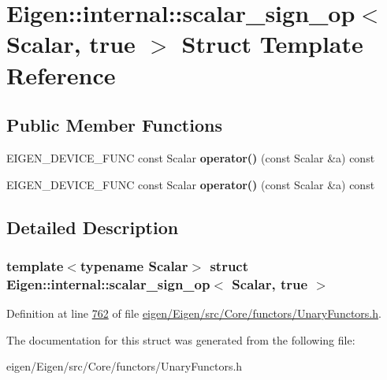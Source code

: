 \hypertarget{struct_eigen_1_1internal_1_1scalar__sign__op_3_01_scalar_00_01true_01_4}{}\section{Eigen\+:\+:internal\+:\+:scalar\+\_\+sign\+\_\+op$<$ Scalar, true $>$ Struct Template Reference}
\label{struct_eigen_1_1internal_1_1scalar__sign__op_3_01_scalar_00_01true_01_4}
\subsection*{Public Member Functions}
\begin{DoxyCompactItemize}
\item 
\mbox{\label{struct_eigen_1_1internal_1_1scalar__sign__op_3_01_scalar_00_01true_01_4_ab7a307311d19f2b54ce9805727b812a4}} 
E\+I\+G\+E\+N\+\_\+\+D\+E\+V\+I\+C\+E\+\_\+\+F\+U\+NC const Scalar {\bfseries operator()} (const Scalar \&a) const
\item 
\mbox{\label{struct_eigen_1_1internal_1_1scalar__sign__op_3_01_scalar_00_01true_01_4_ab7a307311d19f2b54ce9805727b812a4}} 
E\+I\+G\+E\+N\+\_\+\+D\+E\+V\+I\+C\+E\+\_\+\+F\+U\+NC const Scalar {\bfseries operator()} (const Scalar \&a) const
\end{DoxyCompactItemize}


\subsection{Detailed Description}
\subsubsection*{template$<$typename Scalar$>$\newline
struct Eigen\+::internal\+::scalar\+\_\+sign\+\_\+op$<$ Scalar, true $>$}



Definition at line \hyperlink{eigen_2_eigen_2src_2_core_2functors_2_unary_functors_8h_source_l00762}{762} of file \hyperlink{eigen_2_eigen_2src_2_core_2functors_2_unary_functors_8h_source}{eigen/\+Eigen/src/\+Core/functors/\+Unary\+Functors.\+h}.



The documentation for this struct was generated from the following file\+:\begin{DoxyCompactItemize}
\item 
eigen/\+Eigen/src/\+Core/functors/\+Unary\+Functors.\+h\end{DoxyCompactItemize}
